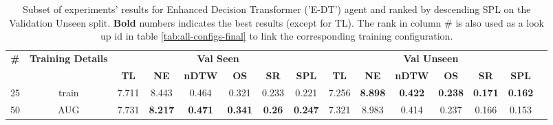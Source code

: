 \begin{table}
\centering
\caption{\label{tab:e_dt_env_drop}Subset of experiments' results for Enhanced Decision Transformer ('E-DT') agent and ranked by descending SPL on the Validation Unseen split. \textbf{Bold} numbers indicates the best results (except for TL). The rank in column \# is also used as a look up id in table \ref{tab:all-configs-final} to link the corresponding training configuration.}
\begin{tabular}{@{\hskip3pt}c@{\hskip3pt}c@{\hskip3pt}c@{\hskip3pt}c@{\hskip3pt}c@{\hskip3pt}c@{\hskip3pt}c@{\hskip3pt}c@{\hskip3pt}c@{\hskip3pt}c@{\hskip3pt}c@{\hskip3pt}c@{\hskip3pt}c@{\hskip3pt}c@{\hskip3pt}c}
\toprule
                                  \textbf{\#} & \textbf{Training Details} & \multicolumn{6}{c}{\textbf{Val Seen}} & \multicolumn{6}{c}{\textbf{Val Unseen}} \\
\cmidrule(l){3-8}\cmidrule(l){9-14}\textbf{~} &                \textbf{~} &       \textbf{TL} &     \textbf{NE} &   \textbf{nDTW} &     \textbf{OS} &    \textbf{SR} &    \textbf{SPL} &         \textbf{TL} &     \textbf{NE} &   \textbf{nDTW} &     \textbf{OS} &     \textbf{SR} &    \textbf{SPL} \\
\midrule
                                           25 &                     train &             7.711 &           8.443 &           0.464 &           0.321 &          0.233 &           0.221 &               7.256 &  \textbf{8.898} &  \textbf{0.422} &  \textbf{0.238} &  \textbf{0.171} &  \textbf{0.162} \\
                                           50 &                       AUG &             7.731 &  \textbf{8.217} &  \textbf{0.471} &  \textbf{0.341} &  \textbf{0.26} &  \textbf{0.247} &               7.321 &           8.983 &           0.414 &           0.237 &           0.166 &           0.153 \\
\bottomrule
\end{tabular}
\end{table}

